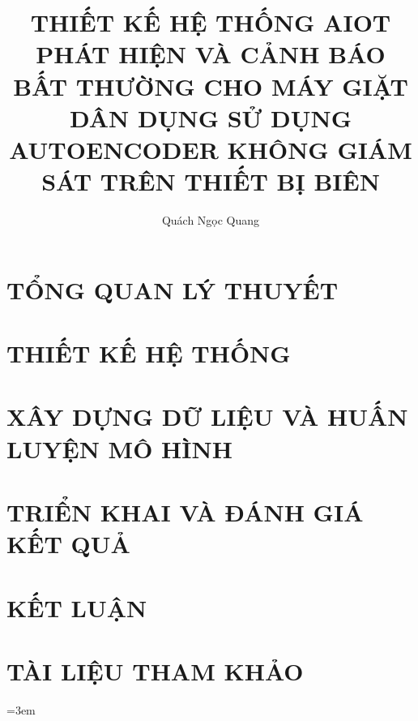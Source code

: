 \documentclass[14pt,a4paper]{report}
\title{THIẾT KẾ HỆ THỐNG AIOT PHÁT HIỆN VÀ CẢNH BÁO BẤT THƯỜNG CHO MÁY GIẶT DÂN DỤNG SỬ DỤNG AUTOENCODER KHÔNG GIÁM SÁT TRÊN THIẾT BỊ BIÊN}
\author{Quách Ngọc Quang}
\begin{document}








\fontsize{13}{15}\selectfont

\chapter{TỔNG QUAN LÝ THUYẾT}








\chapter{THIẾT KẾ HỆ THỐNG}






\chapter{XÂY DỰNG DỮ LIỆU VÀ HUẤN LUYỆN MÔ HÌNH}





\chapter{TRIỂN KHAI VÀ ĐÁNH GIÁ KẾT QUẢ}








\chapter{KẾT LUẬN}




\chapter*{TÀI LIỆU THAM KHẢO}

\begingroup
\renewcommand{\clearpage}{} %
\sloppy
\emergencystretch=3em

\renewcommand{\bibname}{Tài liệu tiếng Anh}



\endgroup
\end{document}
